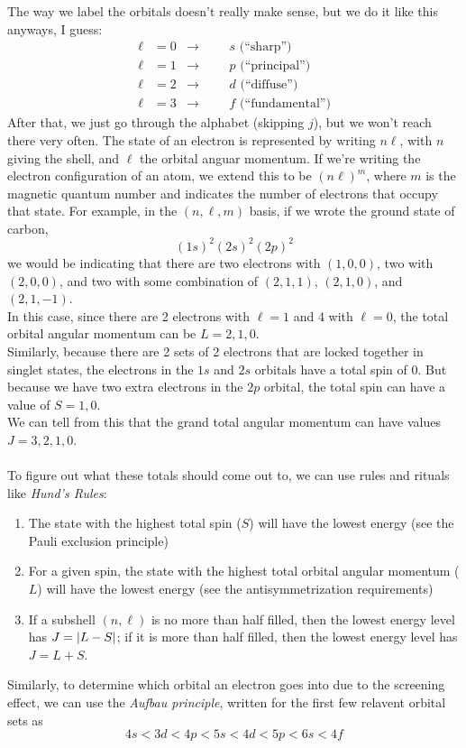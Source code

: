 \documentclass[a4paper]{article}
\begin{document}
The way we label the orbitals doesn't really make sense, but we do it like this
anyways, I guess:
\begin{align*}
	\ell &= 0 &\to&& &s\text{ (``sharp'')}\\
	\ell &= 1 &\to&& &p\text{ (``principal'')}\\
	\ell &= 2 &\to&& &d\text{ (``diffuse'')}\\
	\ell &= 3 &\to&& &f\text{ (``fundamental'')}
\end{align*}
After that, we just go through the alphabet (skipping $j$), but we won't reach
there very often. The state of an electron is represented by writing $n\ell$,
with $n$ giving the shell, and $\ell$ the orbital anguar momentum. If we're
writing the electron configuration of an atom, we extend this to be
$(n\ell)^m$, where $m$ is the magnetic quantum number and indicates the number
of electrons that occupy that state. For example, in the $(n,\ell,m)$ basis,
if we wrote the ground state of carbon,
\[ (1s)^2(2s)^2(2p)^2 \]
we would be indicating that there are two electrons with $(1,0,0)$, two
with $(2,0,0)$, and two with some combination of $(2,1,1)$, $(2,1,0)$, and
$(2,1,-1)$.\\
In this case, since there are 2 electrons with $\ell=1$ and
4 with $\ell=0$, the total orbital angular momentum can be $L=2,1,0$.\\
Similarly, because there are 2 sets of 2 electrons that are locked together
in singlet states, the electrons in the $1s$ and $2s$ orbitals have a total
spin of 0. But because we have two extra electrons in the $2p$ orbital, the
total spin can have a value of $S=1,0$.\\
We can tell from this that the grand total angular momentum can have values
$J=3,2,1,0$.\\~\\
To figure out what these totals should come out to, we can use rules and
rituals like \emph{Hund's Rules}:
\begin{enumerate}
	\item The state with the highest total spin ($S$) will have the lowest
		energy (see the Pauli exclusion principle)
	\item For a given spin, the state with the highest total orbital
		angular momentum ($L$) will have the lowest energy
		(see the antisymmetrization requirements)
	\item If a subshell $(n,\ell)$ is no more than half filled, then the
		lowest energy level has $J=\left\lvert L-S\right\rvert$; if it is more than half
		filled, then the lowest energy level has $J=L+S$.
\end{enumerate}
Similarly, to determine which orbital an electron goes into due to the
screening effect, we can use the \emph{Aufbau principle}, written for the first
few relavent orbital sets as
\[ 4s<3d<4p<5s<4d<5p<6s<4f \]
\end{document}
